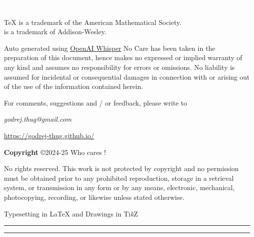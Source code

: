 \thispagestyle{empty}
\textcolor{white}{test}

\vspace{-6mm}

\noindent \TeX{} is a trademark of the American Mathematical Society.
\vspace{2mm}\\
\MF{} is a trademark of Addison-Wesley.

\vspace{12mm}

Auto generated using \href{https://github.com/openai/whisper}{OpenAI Whisper} No Care has been taken in the preparation of this document, hence makes no expressed or implied warranty of any kind and assumes no responsibility for errors or omissions. No liability is assumed for incidental or consequential damages in connection with or arising out of the use of the information contained herein.

\vspace{1.0cm}

For comments, suggestions and / or feedback, please write to  
\begin{center}
{\centering \color{BurntOrange}\emph{godrej.thug@gmail.com}}
\end{center}

\begin{center}
\url{https://godrej-thug.github.io/}
\end{center}


\vspace{0.5in}


\noindent \textbf{Copyright} \copyright 2024-25 Who cares !

\vspace{0.5in}

\indent No rights reserved. This work is not protected by copyright and no permission must be obtained prior to any prohibited reproduction, storage in a retrieval system, or transmission in any form or by any means, electronic, mechanical, photocopying, recording, or likewise unless stated otherwise.




\begin{center}
\color{Fuchsia} Typesetting in \LaTeX{} and Drawings in Ti\emph{k}Z
\end{center}

\vspace{10mm}

\hrule
\begin{center}
\vspace{-3mm}
\vspace{-3mm}
\end{center}
\hrule


\newpage
\clearpage
